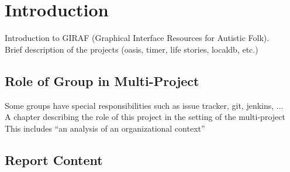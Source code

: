 \chapter{Introduction}

Introduction to GIRAF (Graphical Interface Resources for Autistic Folk).\\
Brief description of the projects (oasis, timer, life stories, localdb, etc.)\\


\section{Role of Group in Multi-Project}
Some groups have special responsibilities such as issue tracker, git, jenkins, ...\\
A chapter describing the role of this project in the setting of the multi-project\\
This includes ``an analysis of an organizational context''




\section{Report Content}
